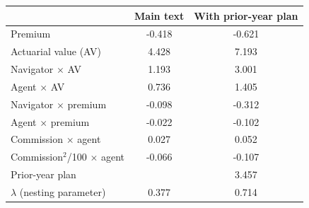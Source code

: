 \begin{tabular}{lcc}
\hline\hline
 & Main text & With prior-year plan \\
\hline
Premium & -0.418 & -0.621 \\
Actuarial value (AV) & 4.428 & 7.193 \\
Navigator $\times$ AV & 1.193 & 3.001 \\
Agent $\times$ AV & 0.736 & 1.405 \\
Navigator $\times$ premium & -0.098 & -0.312 \\
Agent $\times$ premium & -0.022 & -0.102 \\
Commission $\times$ agent & 0.027 & 0.052 \\
Commission$^2$/100 $\times$ agent & -0.066 & -0.107 \\
Prior-year plan &  & 3.457 \\
$\lambda$ (nesting parameter) & 0.377 & 0.714 \\
\hline\hline
\end{tabular}
